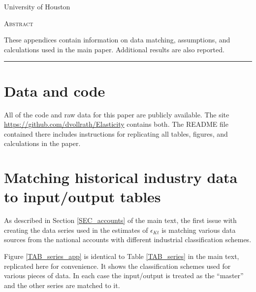 \documentclass[11pt]{article}
\begin{document}
\begin{titlepage}
\vspace{2in} \noindent {\large \today}

\vspace{.5in} 

\vspace{.25in} 

\vspace{.05in} \noindent University of Houston

\vfill \noindent \textsc{Abstract} \hrulefill

\vspace{.05in} \noindent These appendices contain information on data matching, assumptions, and calculations used in the main paper. Additional results are also reported.
 
\vspace{.1in} \hrule

\vspace{.1in} 
\end{titlepage}

\pagebreak 

\tableofcontents
\listoffigures
\listoftables

\section{Data and code}
\onehalfspacing All of the code and raw data for this paper are publicly available. The site \url{https://github.com/dvollrath/Elasticity} contains both. The README file contained there includes instructions for replicating all tables, figures, and calculations in the paper. 

\section{Matching historical industry data to input/output tables}
As described in Section \ref{SEC_accounts} of the main text, the first issue with creating the data series used in the estimates of $\epsilon_{Kt}$ is matching various data sources from the national accounts with different industrial classification schemes. 

Figure \ref{TAB_series_app} is identical to Table \ref{TAB_series} in the main text, replicated here for convenience. It shows the classification schemes used for various pieces of data. In each case the input/output is treated as the ``master'' and the other series are matched to it. 
\end{document}
